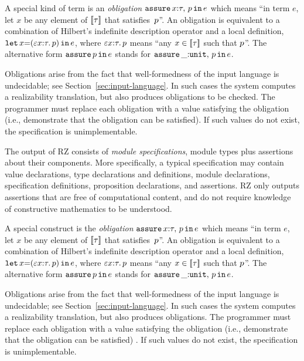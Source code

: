 A special kind of term is an
\emph{obligation} $\mathtt{assure}\,x{:}\tau,\,p\,\mathtt{in}\,e$ which means ``in term
$e$, let $x$ be any element of $[\![\tau]\!]$ that satisfies~$p$''.
An obligation is equivalent to a combination of Hilbert's indefinite
description operator and a local definition,
$\mathtt{let}\,x{=}(\varepsilon x {:} \tau.\,p)\,\mathtt{in}\,e$, where
$\varepsilon x {:} \tau.\, p$ means ``any $x \in [\![\tau]\!]$
such that $p$''. The alternative form $\mathtt{assure}\,p\,\mathtt{in}\,e$ stands
for $\mathtt{assure}\,\_{:}\mathtt{unit},\,p\,\mathtt{in}\,e$. 

Obligations arise from the fact that well-formedness 
of the input language is undecidable; see Section~\ref{sec:input-language}.  
In such cases the system computes a realizability translation, but also produces obligations 
to be checked.  The programmer must
replace each obligation with a value satisfying the
obligation (i.e., demonstrate that the obligation can be satisfied). 
If such values do not exist, the specification is
unimplementable.

\else %

The output of RZ consists of \emph{module specifications}, module
types plus assertions about their components. More specifically, a
typical specification may contain value declarations, type
declarations and definitions, module declarations, specification
definitions, proposition declarations, and assertions. RZ only outputs
assertions that are free of computational content, and do not require
knowledge of constructive mathematics to be understood.

A special construct is the 
\emph{obligation} $\mathtt{assure}\,x{:}\tau,\,p\,\mathtt{in}\,e$ which means ``in term
$e$, let $x$ be any element of $[\![\tau]\!]$ that satisfies~$p$''.
An obligation is equivalent to a combination of Hilbert's indefinite
description operator and a local definition,
$\mathtt{let}\,x{=}(\varepsilon x {:} \tau.\,p)\,\mathtt{in}\,e$, where
$\varepsilon x {:} \tau.\, p$ means ``any $x \in [\![\tau]\!]$
such that $p$''. The alternative form $\mathtt{assure}\,p\,\mathtt{in}\,e$ stands
for $\mathtt{assure}\,\_{:}\mathtt{unit},\,p\,\mathtt{in}\,e$. 

Obligations arise from the fact that well-formedness 
of the input language is undecidable; see Section~\ref{sec:input-language}.  
In such cases the system computes a realizability translation, but also produces obligations.  The programmer must
replace each obligation with a value satisfying the
obligation%
\iflong
(i.e., demonstrate that the obligation can be satisfied)
\fi %
. 
If such values do not exist, the specification is
unimplementable.

\fi %

